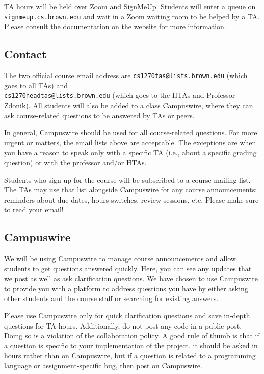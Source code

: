 \documentclass{article}
\begin{document}
TA hours will be held over Zoom and SignMeUp. Students will enter a queue on \\ \texttt{signmeup.cs.brown.edu} and wait in a Zoom waiting room to be helped by a TA. Please consult the documentation on the website for more information.

\subsection{Contact}
The two official course email address are \texttt{cs1270tas@lists.brown.edu} (which goes to all TAs) and \\
\texttt{cs1270headtas@lists.brown.edu} (which goes to the HTAs and Professor Zdonik). All students will also be added to a class Campuswire, where they can ask course-related questions to be answered by TAs or peers.

In general, Campuswire should be used for all course-related questions. For more urgent or matters, the email lists above are acceptable. The exceptions are when you have a reason to speak only with a specific TA (i.e., about a specific grading question) or with the professor and/or HTAs.

Students who sign up for the course will be subscribed to a course mailing list. The TAs may use that list alongside Campuswire for any course announcements: reminders about due dates, hours switches, review sessions, etc. Please make sure to read your email!

\subsection{Campuswire}
We will be using Campuswire to manage course announcements and allow students to get questions answered quickly. Here, you can see any updates that we post as well as ask clarification questions. We have chosen to use Campuswire to provide you with a platform to address questions you have by either asking other students and the course staff or searching for existing answers.

Please use Campuswire only for quick clarification questions and save in-depth questions for TA hours. Additionally, do not post any code in a public post. Doing so is a violation of the collaboration policy. A good rule of thumb is that if a question is specific to your implementation of the project, it should be asked in hours rather than on Campuswire, but if a question is related to a programming language or assignment-specific bug, then post on Campuswire.
\end{document}
